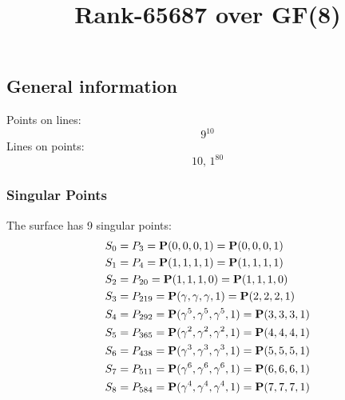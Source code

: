 \documentclass{article}
\newcommand\setTBstruts{\def\T{\rule{0pt}{2.6ex}}%
\def\B{\rule[-1.2ex]{0pt}{0pt}}}
\newcommand{\bP}{{\bf P}}
\begin{document}
 
\setTBstruts



{\allowdisplaybreaks%






\title{Rank-65687 over GF(8)}
\author{}%
\maketitle%
%
{}



\subsection*{General information}
Points on lines:
$$
9^{10}$$
Lines on points:
$$
10,\,1^{80}$$
\subsubsection*{Singular Points}
The surface has 9 singular points:\\
\begin{align*}
S_{0} &= P_{3}=\bP(0, 0, 0, 1) = \bP(0, 0, 0, 1)\\
S_{1} &= P_{4}=\bP(1, 1, 1, 1) = \bP(1, 1, 1, 1)\\
S_{2} &= P_{20}=\bP(1, 1, 1, 0) = \bP(1, 1, 1, 0)\\
S_{3} &= P_{219}=\bP(\gamma , \gamma , \gamma , 1) = \bP(2, 2, 2, 1)\\
S_{4} &= P_{292}=\bP(\gamma^{5}, \gamma^{5}, \gamma^{5}, 1) = \bP(3, 3, 3, 1)\\
S_{5} &= P_{365}=\bP(\gamma^{2}, \gamma^{2}, \gamma^{2}, 1) = \bP(4, 4, 4, 1)\\
S_{6} &= P_{438}=\bP(\gamma^{3}, \gamma^{3}, \gamma^{3}, 1) = \bP(5, 5, 5, 1)\\
S_{7} &= P_{511}=\bP(\gamma^{6}, \gamma^{6}, \gamma^{6}, 1) = \bP(6, 6, 6, 1)\\
S_{8} &= P_{584}=\bP(\gamma^{4}, \gamma^{4}, \gamma^{4}, 1) = \bP(7, 7, 7, 1)\\
\end{align*}
}
\end{document}
